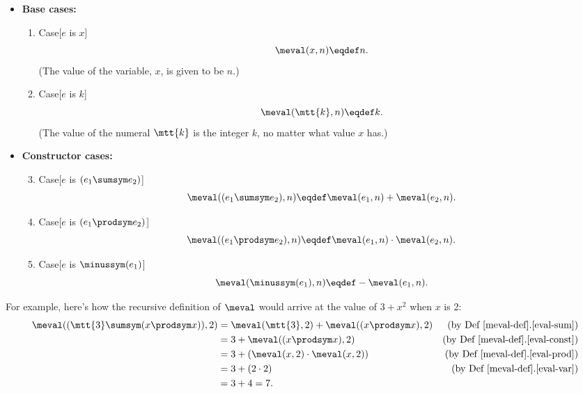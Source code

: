\begin{definition}
\begin{definition}
\begin{itemize}
\item \textbf{Base cases:}

\begin{enumerate}

\item\label{eval-var} Case[$e$ is $x$]
\[
\meval(x, n) \eqdef n.
\]
(The value of the variable, $x$, is given to be $n$.)

\item\label{eval-const} Case[$e$ is $k$]
\[
\meval(\mtt{k}, n) \eqdef k.
\]
(The value of the numeral $\mtt{k}$ is the integer $k$, no matter what
value $x$ has.)

\end{enumerate}

\item \textbf{Constructor cases:}

\begin{enumerate}
\setcounter{enumi}{2}

\item\label{eval-sum} Case[$e$ is $(e_1 \sumsym e_2)$]
\[
\meval((e_1 \sumsym e_2),n) \eqdef
  \meval(e_1,n)+\meval(e_2,n).
\]

\item\label{eval-prod} Case[$e$ is $(e_1 \prodsym e_2)$]
\[
\meval((e_1 \prodsym e_2),n) \eqdef \meval(e_1,n) \cdot \meval(e_2,n).
\]

\item\label{eval-minus} Case[$e$ is $\minussym(e_1)$]
\[
\meval(\minussym(e_1),n) \eqdef - \meval(e_1,n).
\]
\end{enumerate}

\end{itemize}

\end{definition}

For example, here's how the recursive definition of $\meval$ would arrive at
the value of $3+x^2$ when $x$ is 2:
\begin{align*}
\meval((\mtt{3} \sumsym (x \prodsym x)),2)
 & = \meval(\mtt{3},2) + \meval((x \prodsym x),2)
                  & \text{(by~Def~\ref{meval-def}.\ref{eval-sum})}\\
 & = 3 + \meval((x \prodsym x),2) & \text{(by~Def~\ref{meval-def}.\ref{eval-const})}\\
 & = 3 + (\meval(x,2) \cdot \meval(x,2)) & \text{(by~Def~\ref{meval-def}.\ref{eval-prod})}\\
 & = 3 + (2 \cdot 2) & \text{(by~Def~\ref{meval-def}.\ref{eval-var})}\\
 & = 3 + 4 = 7.
\end{align*}


\end{definition}
